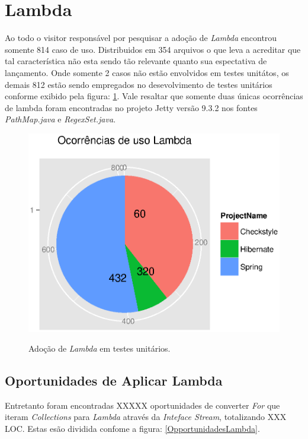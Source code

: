 \section{Lambda}
Ao todo o visitor responsável por pesquisar a adoção de \textit{Lambda} encontrou somente 814 caso de uso. Distribuidos em 354 arquivos o que leva a acreditar que tal característica não esta sendo tão relevante quanto sua espectativa de lançamento. Onde somente 2 casos não estão envolvidos em testes unitátos, os demais 812 estão sendo empregados no desevolvimento de testes unitários conforme exibido pela figura: \ref{fig:AdocaoLambda}. Vale resaltar que somente duas únicas ocorrências de lambda foram encontradas no projeto Jetty versão 9.3.2 nos fontes \textit{PathMap.java} e \textit{RegexSet.java}.\\

\begin{figure}[h]
	\center
	\includegraphics[scale=0.8]{Imagens/AdocaoLambdaTestes}
	\label{fig:AdocaoLambda}
	\caption{Adoção de \textit{Lambda} em testes unitários.}
\end{figure}



\subsection{Oportunidades de Aplicar Lambda}
Entretanto foram encontradas XXXXX oportunidades de converter \textit{For} que iteram \textit{Collections} para \textit{Lambda} através da \textit{Inteface Stream}, totalizando XXX \acs{LOC}. Estas esão dividida confome a figura: \ref{OpportunidadesLambda}.\\

